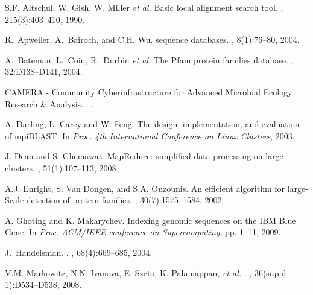 \documentclass[10pt,journal,letterpaper,compsoc]{IEEEtran}
\begin{document}
\begin{thebibliography}{1}

S.F. Altschul, W. Gish, W. Miller {\it et al.}
\newblock Basic local alignment search tool.
, 215(3):403--410, 1990.

R.~Apweiler, A.~Bairoch, and C.H. Wu.
 sequence databases.
, 8(1):76--80, 2004.


A.~Bateman, L.~Coin, R.~Durbin {\it et al.}
\newblock The {Pfam} protein families database.
, 32:D138--D141, 2004.

CAMERA - Community Cyberinfrastructure for Advanced Microbial Ecology Research \& Analysis.
. 
.


A. Darling, L. Carey and W. Feng.
\newblock The design, implementation, and evaluation of mpiBLAST.
\newblock In {\em Proc. 4th International Conference on Linux Clusters}, 2003.

J. Dean and S. Ghemawat.
\newblock MapReduce: simplified data processing on large clusters.
, 51(1):107--113, 2008

A.J. Enright, S. Van Dongen, and S.A. Ouzounis.
\newblock An efficient algorithm for large-Scale detection of protein families.
, 30(7):1575--1584, 2002.


A. Ghoting and K. Makarychev.
\newblock Indexing genomic sequences on the IBM Blue Gene.
\newblock In {\em Proc. ACM/IEEE conference on Supercomputing}, pp. 1--11, 2009.

J.~Handelsman.
.
, 68(4):669--685, 2004.


V.M. Markowitz, N.N. Ivanova, E. Szeto, K. Palaniappan, {\it et al.}
.
, 36(suppl 1):D534--D538, 2008.



\end{thebibliography}
\end{document}
